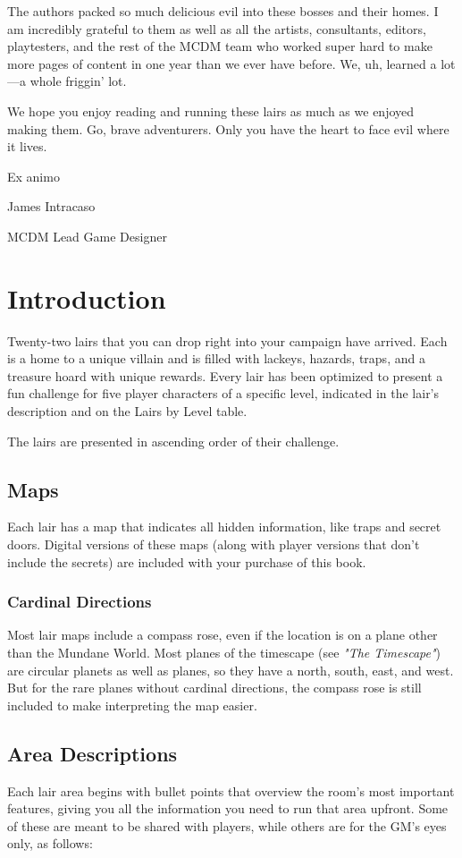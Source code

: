 \documentclass[10pt,a4paper,twoside,bg=print,twocolumn,openany,nodeprecatedcode]{dndbook}
\begin{document}
The authors packed so much delicious evil into these bosses and their homes. I am incredibly grateful to them as well as all the artists, consultants, editors, playtesters, and the rest of the MCDM team who worked super hard to make more pages of content in one year than we ever have before. We, uh, learned a lot—a whole friggin' lot.

We hope you enjoy reading and running these lairs as much as we enjoyed making them. Go, brave adventurers. Only you have the heart to face evil where it lives.

Ex animo

James Intracaso

MCDM Lead Game Designer

\chapter*{Introduction}
Twenty-two lairs that you can drop right into your campaign have arrived. Each is a home to a unique villain and is filled with lackeys, hazards, traps, and a treasure hoard with unique rewards. Every lair has been optimized to present a fun challenge for five player characters of a specific level, indicated in the lair's description and on the Lairs by Level table.

The lairs are presented in ascending order of their challenge.

\section{Maps}
Each lair has a map that indicates all hidden information, like traps and secret doors. Digital versions of these maps (along with player versions that don't include the secrets) are included with your purchase of this book.

\subsection{Cardinal Directions}
Most lair maps include a compass rose, even if the location is on a plane other than the Mundane World. Most planes of the timescape (see \textit{"The Timescape"}) are circular planets as well as planes, so they have a north, south, east, and west. But for the rare planes without cardinal directions, the compass rose is still included to make interpreting the map easier.

\section{Area Descriptions}
Each lair area begins with bullet points that overview the room's most important features, giving you all the information you need to run that area upfront. Some of these are meant to be shared with players, while others are for the GM's eyes only, as follows:
\end{document}

